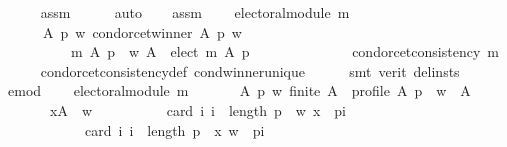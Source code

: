 \begin{isabellebody}
\ \ \ \ \isamarkupfalse%
\ assm{}\isanewline
\ \ \ \ \isamarkupfalse%
\ auto\isanewline
{}\isamarkupfalse%
\isanewline
\ \ \isamarkupfalse%
\ assm{}{\isacharcolon}{\kern0pt}\isanewline
\ \ \ \ {\isachardoublequoteopen}electoral{\isacharunderscore}{\kern0pt}module\ m\ {\isasymLongrightarrow}\isanewline
\ \ \ \ \ \ {\isasymforall}A\ p\ w{\isachardot}{\kern0pt}\ condorcet{\isacharunderscore}{\kern0pt}winner\ A\ p\ w\ {\isasymlongrightarrow}\isanewline
\ \ \ \ \ \ \ \ \ \ m\ A\ p\ {\isacharequal}{\kern0pt}\ {\isacharparenleft}{\kern0pt}{\isacharbraceleft}{\kern0pt}w{\isacharbraceright}{\kern0pt}{\isacharcomma}{\kern0pt}\ A\ {\isacharminus}{\kern0pt}\ elect\ m\ A\ p{\isacharcomma}{\kern0pt}\ {\isacharbraceleft}{\kern0pt}{\isacharbraceright}{\kern0pt}{\isacharparenright}{\kern0pt}\ {\isasymLongrightarrow}\isanewline
\ \ \ \ \ \ \ \ \ \ \ \ condorcet{\isacharunderscore}{\kern0pt}consistency\ m{\isachardoublequoteclose}\isanewline
\ \ \ \ \isamarkupfalse%
\ condorcet{\isacharunderscore}{\kern0pt}consistency{\isacharunderscore}{\kern0pt}def\ cond{\isacharunderscore}{\kern0pt}winner{\isacharunderscore}{\kern0pt}unique{}\isanewline
\ \ \ \ \isamarkupfalse%
\ {\isacharparenleft}{\kern0pt}smt\ {\isacharparenleft}{\kern0pt}verit{\isacharcomma}{\kern0pt}\ del{\isacharunderscore}{\kern0pt}insts{\isacharparenright}{\kern0pt}{\isacharparenright}{\kern0pt}\isanewline
\ \ \isamarkupfalse%
\ e{\isacharunderscore}{\kern0pt}mod{\isacharcolon}{\kern0pt}\isanewline
\ \ \ \ {\isachardoublequoteopen}electoral{\isacharunderscore}{\kern0pt}module\ m{\isachardoublequoteclose}\isanewline
\ \ \isamarkupfalse%
\isanewline
\ \ \ \ {\isachardoublequoteopen}{\isasymforall}A\ p\ w{\isachardot}{\kern0pt}\ finite\ A\ {\isasymand}\ profile\ A\ p\ {\isasymand}\ w\ {\isasymin}\ A\ {\isasymand}\isanewline
\ \ \ \ \ \ \ {\isacharparenleft}{\kern0pt}{\isasymforall}x{\isasymin}A\ {\isacharminus}{\kern0pt}\ {\isacharbraceleft}{\kern0pt}w{\isacharbraceright}{\kern0pt}{\isachardot}{\kern0pt}\isanewline
\ \ \ \ \ \ \ \ \ \ card\ {\isacharbraceleft}{\kern0pt}i{\isachardot}{\kern0pt}\ i\ {\isacharless}{\kern0pt}\ length\ p\ {\isasymand}\ {\isacharparenleft}{\kern0pt}w{\isacharcomma}{\kern0pt}\ x{\isacharparenright}{\kern0pt}\ {\isasymin}\ {\isacharparenleft}{\kern0pt}p{\isacharbang}{\kern0pt}i{\isacharparenright}{\kern0pt}{\isacharbraceright}{\kern0pt}\ {\isacharless}{\kern0pt}\isanewline
\ \ \ \ \ \ \ \ \ \ \ \ card\ {\isacharbraceleft}{\kern0pt}i{\isachardot}{\kern0pt}\ i\ {\isacharless}{\kern0pt}\ length\ p\ {\isasymand}\ {\isacharparenleft}{\kern0pt}x{\isacharcomma}{\kern0pt}\ w{\isacharparenright}{\kern0pt}\ {\isasymin}\ {\isacharparenleft}{\kern0pt}p{\isacharbang}{\kern0pt}i{\isacharparenright}{\kern0pt}{\isacharbraceright}{\kern0pt}{\isacharparenright}{\kern0pt}\ {\isasymlongrightarrow}\isanewline

\end{isabellebody}
